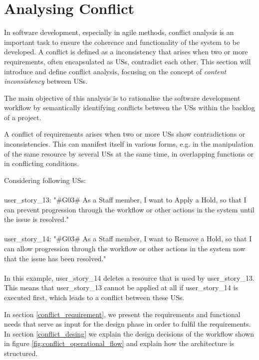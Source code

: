 \section{Analysing Conflict}\label{conflict}
In software development, especially in agile methods, conflict analysis is an important task to ensure the coherence and functionality of the system to be developed. A conflict is defined as a inconsistency that arises when two or more requirements, often encapsulated as USs, contradict each other. This section will introduce and define conflict analysis, focusing on the concept of \textit{content inconsistency} between USs.

The main objective of this analysis is to rationalise the software development workflow by semantically identifying conflicts between the USs within the backlog of a project.

A conflict of requirements arises when two or more USs show contradictions or inconsistencies. This can manifest itself in various forms, e.g. in the manipulation of the same resource by several USs at the same time, in overlapping functions or in conflicting conditions.

\begin{example}
	Considering following USs:\\\\
	user\_story\_13: "\#G03\# As a Staff member, I want to Apply a Hold, so that I can prevent progression through the workflow or other actions in the system until the issue is resolved."\\\\
	user\_story\_14: "\#G03\# As a Staff member, I want to Remove a Hold, so that I can allow progression through the workflow or other actions in the system now that the issue has been resolved."\\\\
	In this example, user\_story\_14 deletes a resource that is used by user\_story\_13. This means that user\_story\_13 cannot be applied at all if user\_story\_14 is executed first, which leads to a conflict between these USs.
\end{example}

In section \ref{conflict_requirement}, we present the requirements and functional needs that serve as input for the design phase in order to fulfil the requirements. In section \ref{conflict_desing} we explain the design decisions of the workflow shown in figure \ref{fig:conflict_operational_flow} and explain how the architecture is structured. 

